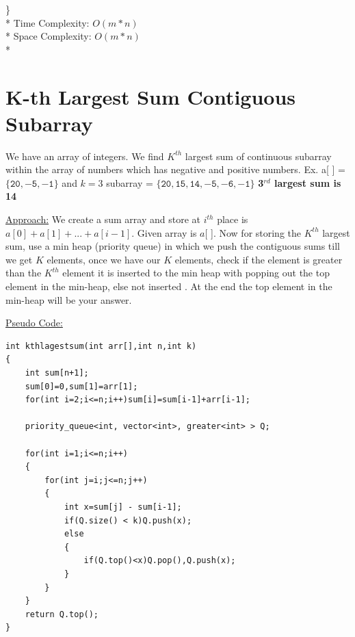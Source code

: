 \documentclass[12pt]{book}
\begin{document}
\} \\*
\newline
Time Complexity:
$O(m*n)$ \\*
Space Complexity:
$O(m*n)$ \\*
\newline

\chapter{K-th Largest Sum Contiguous Subarray}
We have an array of integers. We find $K^{th}$ largest sum of continuous subarray within the array of numbers which has negative and positive numbers.\newline\newline
Ex.\newline
a[ ] = $\mathtt{\{20, -5, -1\}}$ and $k = 3$\newline
	subarray = $\mathtt{\{20, 15, 14, -5, -6, -1\}}$\newline
	\textbf{3$^{rd}$ largest sum is 14}\newline\newline

\underline{Approach:} We create a sum array and store at $i^{th}$ place is $a[0] + a[1] + ... + a[i-1]$.
\newline
Given array is $a$[ ].\newline
Now for storing the $K^{th}$ largest sum, use a min heap (priority queue) in which we push the contiguous sums till we get $K$ elements, once we have our $K$ elements, check if the element is greater than the $K^{th}$ element it is inserted to the min heap with popping out the top element in the min-heap, else not inserted . At the end the top element in the min-heap will be your answer.\newline\newline

\underline{Pseudo Code:}\newline
\begin{lstlisting}
int kthlagestsum(int arr[],int n,int k)
{
	int sum[n+1];
	sum[0]=0,sum[1]=arr[1];
	for(int i=2;i<=n;i++)sum[i]=sum[i-1]+arr[i-1];

	priority_queue<int, vector<int>, greater<int> > Q;

	for(int i=1;i<=n;i++)
	{
		for(int j=i;j<=n;j++)
		{
			int x=sum[j] - sum[i-1];
			if(Q.size() < k)Q.push(x);
			else
			{
				if(Q.top()<x)Q.pop(),Q.push(x);
			}
		}
	}
	return Q.top();
}
\end{lstlisting}
\end{document}
